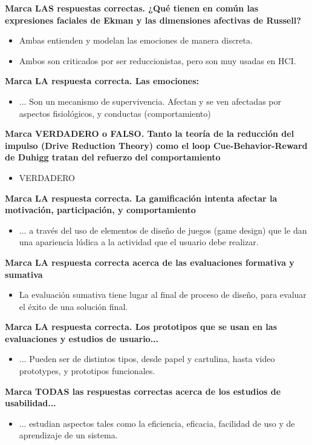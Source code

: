 \documentclass[12pt, twoside, openright]{report} %
\begin{document}
\textbf{Marca LAS respuestas correctas. ¿Qué tienen en común las expresiones faciales de Ekman y las dimensiones afectivas de Russell?}
\begin{itemize}
  \item Ambas entienden y modelan las emociones de manera discreta.
  \item Ambos son criticados por ser reduccionistas, pero son muy usadas en HCI.
\end{itemize}

\textbf{Marca LA respuesta correcta. Las emociones:}
\begin{itemize}
  \item ... Son un mecanismo de supervivencia. Afectan y se ven afectadas por aspectos fisiológicos, y conductas (comportamiento)
\end{itemize}

\textbf{Marca VERDADERO o FALSO. Tanto la teoría de la reducción del impulso (Drive Reduction Theory) como el loop Cue-Behavior-Reward de Duhigg tratan del refuerzo del comportamiento}
\begin{itemize}
  \item VERDADERO
\end{itemize}

\textbf{Marca LA respuesta correcta. La gamificación intenta afectar la motivación, participación, y comportamiento}
\begin{itemize}
  \item ... a través del uso de elementos de diseño de juegos (game design) que le dan una apariencia lúdica a la actividad que el usuario debe realizar.
\end{itemize}

\textbf{Marca LA respuesta correcta acerca de las evaluaciones formativa y sumativa}
\begin{itemize}
  \item La evaluación sumativa tiene lugar al final de proceso de diseño, para evaluar el éxito de una solución final.
\end{itemize}

\textbf{Marca LA respuesta correcta. Los prototipos que se usan en las evaluaciones y estudios de usuario...}
\begin{itemize}
  \item ... Pueden ser de distintos tipos, desde papel y cartulina, hasta video prototypes, y prototipos funcionales. 
\end{itemize}

\textbf{Marca TODAS las respuestas correctas acerca de los estudios de usabilidad...}
\begin{itemize}
  \item ... estudian aspectos tales como la eficiencia, eficacia, facilidad de uso y de aprendizaje de un sistema.
\end{itemize}
\end{document}

